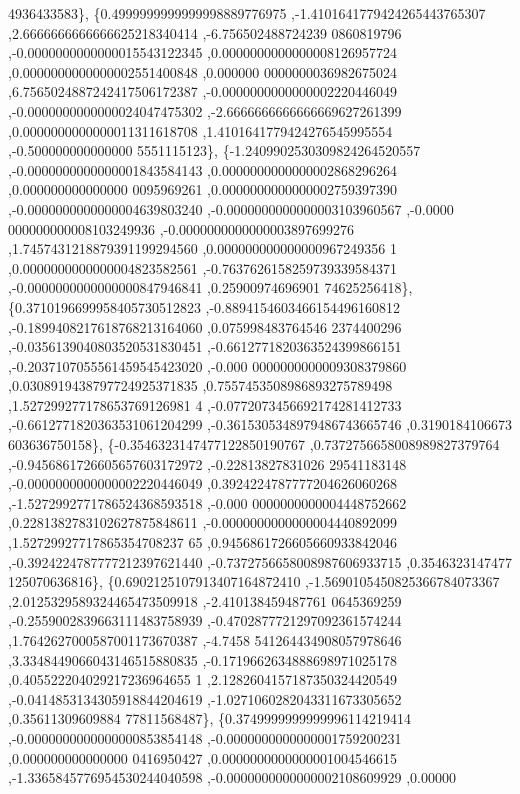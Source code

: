 \begin{DoxyCode}
      4936433583\},
\{0.4999999999999998889776975 ,-1.4101641779424265443765307 ,2.6666666666666625218340414 ,-6.756502488724239
      0860819796 ,-0.0000000000000015543122345 ,0.0000000000000008126957724 ,0.0000000000000002551400848 ,0.000000
      0000000036982675024 ,6.7565024887242417506172387 ,-0.0000000000000002220446049 ,-0.0000000000000024047475302
       ,-2.6666666666666669627261399 ,0.0000000000000011311618708 ,1.4101641779424276545995554 ,-0.500000000000000
      5551115123\},
\{-1.2409902530309824264520557 ,-0.0000000000000001843584143 ,0.0000000000000002868296264 ,0.000000000000000
      0095969261 ,0.0000000000000002759397390 ,-0.0000000000000004639803240 ,-0.0000000000000003103960567 ,-0.0000
      000000000008103249936 ,-0.0000000000000003897699276 ,1.7457431218879391199294560 ,0.000000000000000967249356
      1 ,0.0000000000000004823582561 ,-0.7637626158259739339584371 ,-0.0000000000000000847946841 ,0.25900974696901
      74625256418\},
\{0.3710196699958405730512823 ,-0.8894154603466154496160812 ,-0.1899408217618768213164060 ,0.075998483764546
      2374400296 ,-0.0356139040803520531830451 ,-0.6612771820363524399866151 ,-0.2037107055561459545423020 ,-0.000
      0000000000009308379860 ,0.0308919438797724925371835 ,0.7557453508986893275789498 ,1.527299277178653769126981
      4 ,-0.0772073456692174281412733 ,-0.6612771820363531061204299 ,-0.3615305348979486743665746 ,0.3190184106673
      603636750158\},
\{-0.3546323147477122850190767 ,0.7372756658008989827379764 ,-0.9456861726605657603172972 ,-0.22813827831026
      29541183148 ,-0.0000000000000002220446049 ,0.3924224787777204626060268 ,-1.5272992771786524368593518 ,-0.000
      0000000000004448752662 ,0.2281382783102627875848611 ,-0.0000000000000004440892099 ,1.52729927717865354708237
      65 ,0.9456861726605660933842046 ,-0.3924224787777212397621440 ,-0.7372756658008987606933715 ,0.3546323147477
      125070636816\},
\{0.6902125107913407164872410 ,-1.5690105450825366784073367 ,2.0125329589324465473509918 ,-2.410138459487761
      0645369259 ,-0.2559002839663111483758939 ,-0.4702877721297092361574244 ,1.7642627000587001173670387 ,-4.7458
      541264434908057978646 ,3.3348449066043146515880835 ,-0.1719662634888698971025178 ,0.405522204029217236964655
      1 ,2.1282604157187350324420549 ,-0.0414853134305918844204619 ,-1.0271060282043311673305652 ,0.35611309609884
      77811568487\},
\{0.3749999999999996114219414 ,-0.0000000000000000853854148 ,-0.0000000000000001759200231 ,0.000000000000000
      0416950427 ,0.0000000000000001004546615 ,-1.3365845776954530244040598 ,-0.0000000000000002108609929 ,0.00000

\end{DoxyCode}
